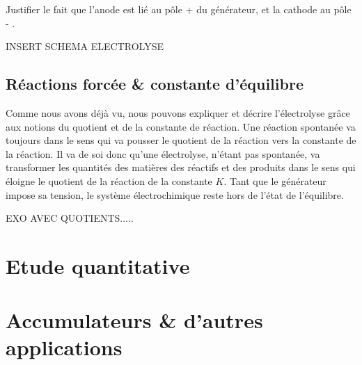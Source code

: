 \documentclass[11pt,a4paper]{article}
\begin{document}
\begin{exo}
Justifier le fait que l'anode est lié au pôle + du générateur, et la cathode au pôle - . 
\vspace{2cm}
\end{exo}


INSERT SCHEMA ELECTROLYSE



\subsection{Réactions forcée \& constante d'équilibre}

Comme nous avons déjà vu, nous pouvons expliquer et décrire l'électrolyse grâce aux notions du quotient et de la constante de réaction. Une réaction spontanée va toujours dans le sens qui va pousser le quotient de la réaction vers la constante de la réaction. Il va de soi donc qu'une électrolyse, n'étant pas spontanée, va transformer les quantités des matières des réactifs et des produits dans le sens qui éloigne le quotient de la réaction de la constante $K$. Tant que le générateur impose sa tension, le système électrochimique reste hors de l'état de l'équilibre. 

EXO AVEC QUOTIENTS.....

\section{Etude quantitative}


\section{Accumulateurs \& d'autres applications}
\end{document}
